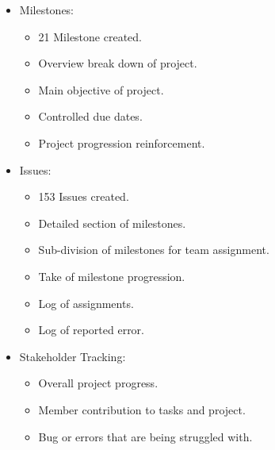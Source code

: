 \documentclass[letterpaper]{article}
\begin{document}
		\begin{itemize}
			\item Milestones:
				\begin{itemize}
					\item 21 Milestone created.
					\item Overview break down of project.
					\item Main objective of project.
					\item Controlled due dates.
					\item Project progression reinforcement.
				\end{itemize}
			\item Issues:
				\begin{itemize}
					\item 153 Issues created.
					\item Detailed section of milestones.
					\item Sub-division of milestones for team assignment.
					\item Take of milestone progression.
					\item Log of assignments.
					\item Log of reported error.
				\end{itemize}
			\item Stakeholder Tracking:
				\begin{itemize}
					\item Overall project progress.
					\item Member contribution to tasks and project.
					\item Bug or errors that are being struggled with.
				\end{itemize}
		\end{itemize}
		
		\vspace{0.2in}
	\section*{\colorbox{black}{}} 
		\vspace{0.1in}
				
\end{document}
